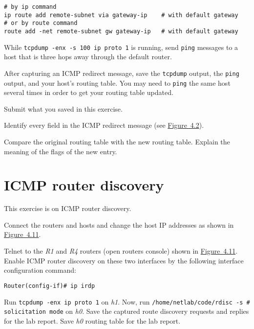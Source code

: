 \documentclass{../UTNetLab}
\begin{document}
    \begin{lstlisting}[emph={eth0,gateway-ip,remote-subnet}]
# by ip command
ip route add remote-subnet via gateway-ip    # with default gateway
# or by route command
route add -net remote-subnet gw gateway-ip   # with default gateway
    \end{lstlisting}

    While \lstinline{tcpdump -enx -s 100 ip proto 1} is running, send \lstinline{ping} messages to a host that is three hops away through the default router.

    After capturing an ICMP redirect message, save the \lstinline{tcpdump} output, the \lstinline{ping} output, and your host’s routing table.
    You may need to \lstinline{ping} the same host several times in order to get your routing table updated.
    
    \begin{report}
        \item Submit what you saved in this exercise.
        
        \item Identify every field in the ICMP redirect message (see \hyperref[fig:4.2]{Figure~4.2}).
        
        \item Compare the original routing table with the new routing table.
    Explain the meaning of the flags of the new entry.
    \end{report}

\section{ICMP router discovery}\label{sec:ICMPRD}
    This exercise is on ICMP router discovery.
    
    Connect the routers and hosts and change the host IP addresses as shown in \hyperref[fig:4.11]{Figure~4.11}.
    
    Telnet to the \textit{R1} and \textit{R4} routers (open routers console) shown in \hyperref[fig:4.11]{Figure~4.11}.
    Enable ICMP router discovery on these two interfaces by the following interface configuration command:
    \begin{lstlisting}[language={cisco}]
Router(config-if)# ip irdp
    \end{lstlisting}
    Run \lstinline{tcpdump -enx ip proto 1} on \textit{h1}.
    Now, run \lstinline{/home/netlab/code/rdisc -s # solicitation mode} on \textit{h0}.
    Save the captured route discovery requests and replies for the lab report.
    Save \textit{h0} routing table for the lab report.
    
\end{document}
